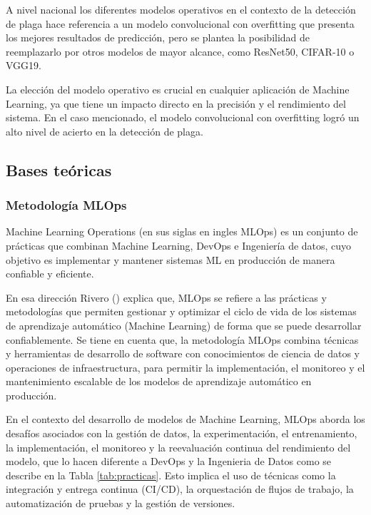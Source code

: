 A nivel nacional los diferentes modelos operativos en el contexto de la detección de plaga hace referencia a un modelo convolucional con overfitting que presenta los mejores resultados de predicción, pero se plantea la posibilidad de reemplazarlo por otros modelos de mayor alcance, como ResNet50, CIFAR-10 o VGG19.

La elección del modelo operativo es crucial en cualquier aplicación de Machine Learning, ya que tiene un impacto directo en la precisión y el rendimiento del sistema. En el caso mencionado, el modelo convolucional con overfitting logró un alto nivel de acierto en la detección de plaga.

\subsection{Bases teóricas}
\subsubsection{Metodología MLOps}

Machine Learning Operations (en sus siglas en ingles MLOps) es un conjunto de prácticas que combinan Machine Learning, DevOps e Ingeniería de datos, cuyo objetivo es implementar y mantener sistemas ML en producción de manera confiable y eficiente.
 
En esa dirección Rivero (\citeyear{rivero2022}) explica que, MLOps se refiere a las prácticas y metodologías que permiten gestionar y optimizar el ciclo de vida de los sistemas de aprendizaje automático (Machine Learning) de forma que se puede desarrollar confiablemente. Se tiene en cuenta que, la metodología MLOps combina técnicas y herramientas de desarrollo de software con conocimientos de ciencia de datos y operaciones de infraestructura, para permitir la implementación, el monitoreo y el mantenimiento escalable de los modelos de aprendizaje automático en producción.

En el contexto del desarrollo de modelos de Machine Learning, MLOps aborda los desafíos asociados con la gestión de datos, la experimentación, el entrenamiento, la implementación, el monitoreo y la reevaluación continua del rendimiento del modelo, que lo hacen diferente a DevOps y la Ingenieria de Datos como se describe en la Tabla \ref{tab:practicas}. Esto implica el uso de técnicas como la integración y entrega continua (CI/CD), la orquestación de flujos de trabajo, la automatización de pruebas y la gestión de versiones.

